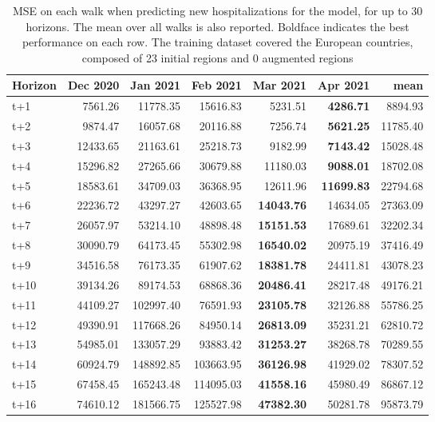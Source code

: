 \begin{table}[H]
\centering
\caption{MSE on each walk when predicting new hospitalizations for the model, for up to 30 horizons. The mean over all walks is also reported. Boldface indicates the best performance on each row. The training dataset covered the European countries, composed of 23 initial regions and 0 augmented regions }
\label{tab:MSE_walk_assembly_1}
\begin{tabular}{lrrrrrr}
\toprule
Horizon &  Dec 2020 &  Jan 2021 &  Feb 2021 &  Mar 2021 &  Apr 2021 &      mean \\
\midrule
t+1  & 7561.26  & 11778.35  & 15616.83  & 5231.51  & \textbf{4286.71}  & 8894.93  \\
t+2  & 9874.47  & 16057.68  & 20116.88  & 7256.74  & \textbf{5621.25}  & 11785.40  \\
t+3  & 12433.65  & 21163.61  & 25218.73  & 9182.99  & \textbf{7143.42}  & 15028.48  \\
t+4  & 15296.82  & 27265.66  & 30679.88  & 11180.03  & \textbf{9088.01}  & 18702.08  \\
t+5  & 18583.61  & 34709.03  & 36368.95  & 12611.96  & \textbf{11699.83}  & 22794.68  \\
t+6  & 22236.72  & 43297.27  & 42603.65  & \textbf{14043.76}  & 14634.05  & 27363.09  \\
t+7  & 26057.97  & 53214.10  & 48898.48  & \textbf{15151.53}  & 17689.61  & 32202.34  \\
t+8  & 30090.79  & 64173.45  & 55302.98  & \textbf{16540.02}  & 20975.19  & 37416.49  \\
t+9  & 34516.58  & 76173.35  & 61907.62  & \textbf{18381.78}  & 24411.81  & 43078.23  \\
t+10  & 39134.26  & 89174.53  & 68868.36  & \textbf{20486.41}  & 28217.48  & 49176.21  \\
t+11  & 44109.27  & 102997.40  & 76591.93  & \textbf{23105.78}  & 32126.88  & 55786.25  \\
t+12  & 49390.91  & 117668.26  & 84950.14  & \textbf{26813.09}  & 35231.21  & 62810.72  \\
t+13  & 54985.01  & 133057.29  & 93883.42  & \textbf{31253.27}  & 38268.78  & 70289.55  \\
t+14  & 60924.79  & 148892.85  & 103663.95  & \textbf{36126.98}  & 41929.02  & 78307.52  \\
t+15  & 67458.45  & 165243.48  & 114095.03  & \textbf{41558.16}  & 45980.49  & 86867.12  \\
t+16  & 74610.12  & 181566.75  & 125527.98  & \textbf{47382.30}  & 50281.78  & 95873.79  \\

\end{tabular}
\end{table}
